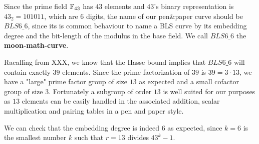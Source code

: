 Since the prime field $\mathbb{F}_{43}$ has $43$ elements and $43$'s binary representation is $43_2= 101011$, which are $6$ digits, the name of our pen\&{}paper curve should be $BLS6\_6$, since its is common behaviour to name a BLS curve by its embedding degree and the bit-length of the modulus in the base field. We call $BLS6\_6$ the \textbf{moon-math-curve}.

Racalling from XXX, we know that the Hasse bound implies that $BLS6\_6$ will contain exactly $39$ elements. Since the prime factorization of $39$ is $39=3\cdot 13$, we have a "large" prime factor group of size $13$ as expected and a small cofactor group of size $3$. Fortunately a subgroup of order $13$ is well suited for our purposes as $13$ elements can be easily handled in the associated addition, scalar multiplication and pairing tables in a pen and paper style. 

We can check that the embedding degree is indeed $6$ as expected, since $k = 6$ is the smallest number $k$ such that $r=13$ divides $43^k-1$. 


